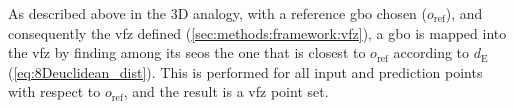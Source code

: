 \documentclass[final,twocolumn,12pt]{elsarticle}
\newcommand{\matlab}[1]{\mbox{\lstinline[style=Matlab-editor]{#1}}}
\newcommand{\inpt}{input}
\newcommand{\outpt}{prediction}
\begin{document}

As described above in the 3D analogy, with a reference \gls{gbo} chosen ($o_{\text{ref}}$), and consequently the \gls{vfz} defined (\cref{sec:methods:framework:vfz}), a \gls{gbo} is mapped into the \gls{vfz} by finding among its \glspl{seo} the one that is closest to $o_{\text{ref}}$ according to $d_{\text{E}}$ (\cref{eq:8Deuclidean_dist}). This is performed for all \inpt{} and \outpt{} points with respect to $o_{\text{ref}}$, and the result is a \gls{vfz} point set.


\end{document}
